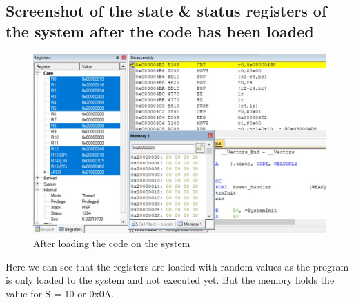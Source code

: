 \documentclass[footheight=20pt, footsepline, headheight=20pt, headsepline]{scrartcl}
\begin{document}
\FloatBarrier
\subsection*{Screenshot of the state \& status registers of the system after the code has been loaded}
\begin{figure}[ht]
    \centering
    \includegraphics[scale=.7]{images/Task3a_Before1.jpg}
    \caption{After loading the code on the system}
    \label{fig:before_task_3a}
\end{figure}
\FloatBarrier
Here we can see that the registers are loaded with random values as the program is only loaded to the system and not executed yet. But the memory holds the value for S = 10 or 0x0A.
\end{document}
